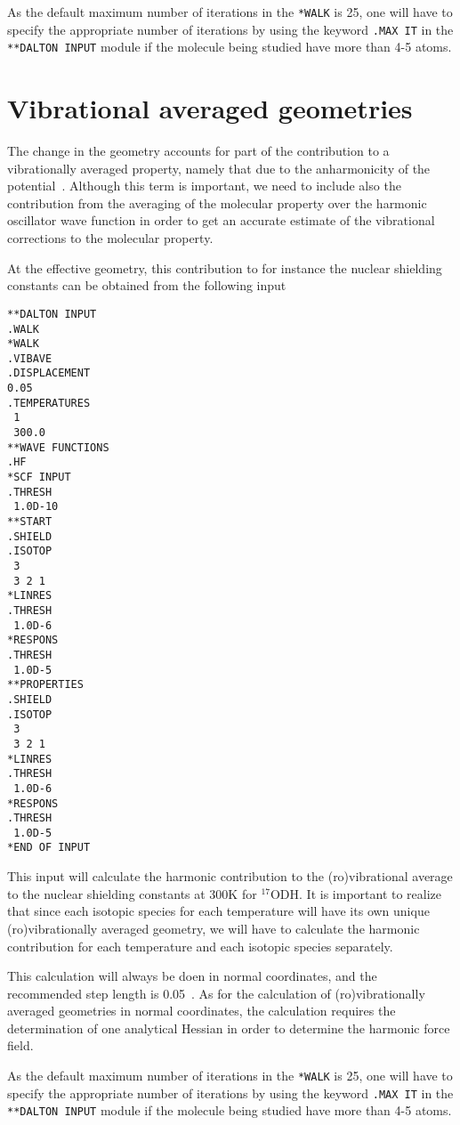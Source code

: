 As the default maximum number of iterations in the \verb|*WALK| is 25,
one will have to specify the appropriate number of iterations by using
the keyword \verb|.MAX IT| in the \verb|**DALTON INPUT| module if the
molecule being studied have more than 4-5 atoms.

\section{Vibrational averaged
geometries}\label{sec:vibavegeo}

The change in the geometry accounts for part of the contribution to a
vibrationally averaged property, namely that due to the anharmonicity
of the potential~\cite{krpoaprtjacs123}. Although this term is important, we need to
include also the contribution from the averaging of the molecular
property over the harmonic oscillator wave function in order to get an
accurate estimate of the vibrational corrections to the molecular
property. 

At the effective geometry, this contribution to for instance the
nuclear shielding constants can be obtained from the following input
\begin{verbatim}
**DALTON INPUT
.WALK
*WALK
.VIBAVE
.DISPLACEMENT
0.05
.TEMPERATURES
 1
 300.0
**WAVE FUNCTIONS
.HF
*SCF INPUT
.THRESH
 1.0D-10
**START
.SHIELD
.ISOTOP
 3
 3 2 1
*LINRES
.THRESH
 1.0D-6
*RESPONS
.THRESH
 1.0D-5
**PROPERTIES
.SHIELD
.ISOTOP
 3
 3 2 1
*LINRES
.THRESH
 1.0D-6
*RESPONS
.THRESH
 1.0D-5
*END OF INPUT
\end{verbatim}

This input will calculate the harmonic contribution to the
(ro)vibrational average to the nuclear shielding constants at 300K for
$^{17}$ODH. It is important to realize that since each isotopic
species for each temperature will have its own unique
(ro)vibrationally averaged geometry, we will have to calculate the
harmonic contribution for each temperature and each isotopic species
separately. 

This calculation will always be doen in normal coordinates, and the
recommended step length is 0.05~\cite{krpoaprtjcp112}. As for the calculation of
(ro)vibrationally averaged geometries in normal coordinates, the
calculation requires the determination of one analytical Hessian in
order to determine the harmonic force field.

As the default maximum number of iterations in the \verb|*WALK| is 25,
one will have to specify the appropriate number of iterations by using
the keyword \verb|.MAX IT| in the \verb|**DALTON INPUT| module if the
molecule being studied have more than 4-5 atoms.

